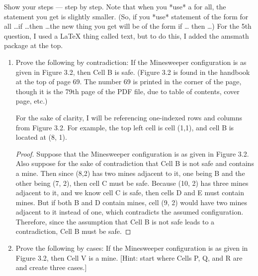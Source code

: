 \documentclass{article}
\begin{document}
Show your steps --- step by step. Note that when you *use* a for all, the
statement you get is slightly smaller. (So, if you *use* statement of the form
for all \ldots if \ldots then \dots the new thing you get will be of the form if \ldots
then \ldots) For the 5th question, I used a LaTeX thing called text, but to do
this, I added the amsmath package at the top.
\begin{enumerate}

    \item Prove the following by contradiction: If the Minesweeper configuration is as
          given in Figure 3.2, then Cell B is safe. (Figure 3.2 is found in the handbook
          at the top of page 69. The number 69 is printed in the corner of the page,
          though it is the 79th page of the PDF file, due to table of contents, cover
          page, etc.)

      For the sake of clarity, I will be referencing one-indexed rows and columns from Figure 3.2. For example, the top left cell is cell (1,1), and cell B is located at (8, 1).

      \begin{proof}
            Suppose that the Minesweeper configuration is as given in Figure 3.2. Also suppose for the sake of contradiction that Cell B is not safe and contains a mine. 
            Then since (8,2) has two mines adjacent to it, one being B and the other being (7, 2), then cell C must be safe.
            Because (10, 2) has three mines adjacent to it, and we know cell C is safe, then cells D and E must contain mines.
            But if both B and D contain mines, cell (9, 2) would have two mines adjacent to it instead of one, which contradicts the assumed configuration.
            Therefore, since the assumption that Cell B is not safe leads to a contradiction, Cell B must be safe.
      \end{proof}

    \newpage

    \item Prove the following by cases: If the Minesweeper configuration is as given in
          Figure 3.2, then Cell V is a mine. [Hint: start where Cells P, Q, and R are and
                  create three cases.]


\end{enumerate}
\end{document}
